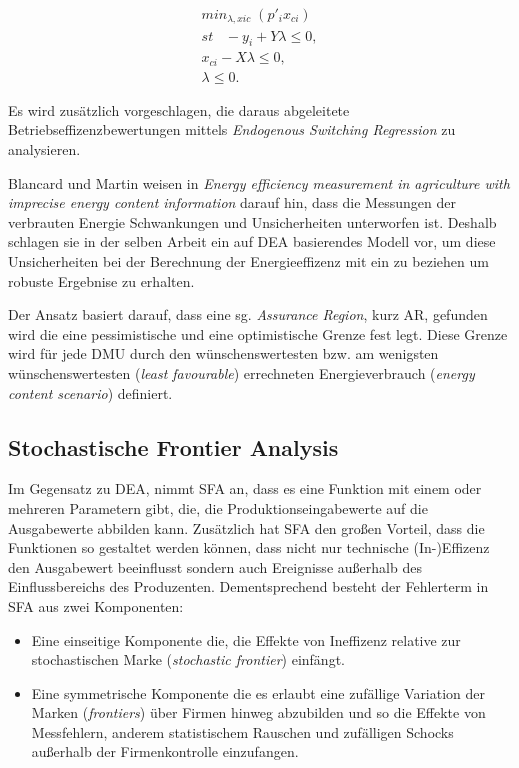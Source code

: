 \begin{gather}
	min_{\lambda,xic} \; (p'_{i}x_{ci}) \\
	st \;\;\; - y_i+Y\lambda \leq 0, \\
	x_{ci} - X \lambda \leq 0, \\
	\lambda \leq 0.
\end{gather}

Es wird zusätzlich vorgeschlagen, die daraus abgeleitete Betriebseffizenzbewertungen mittels \textit{Endogenous Switching Regression} zu analysieren.

Blancard und Martin weisen in \textit{Energy efficiency measurement in agriculture with imprecise energy content information} darauf hin, dass die Messungen der verbrauten Energie Schwankungen und Unsicherheiten unterworfen ist. Deshalb schlagen sie in der selben Arbeit ein auf DEA basierendes Modell vor, um diese Unsicherheiten bei der Berechnung der Energieeffizenz mit ein zu beziehen um robuste Ergebnise zu erhalten.\cite{jour:Blancard2014}

Der Ansatz basiert darauf, dass eine sg. \textit{Assurance Region}, kurz AR, gefunden wird die eine pessimistische und eine optimistische Grenze fest legt. Diese Grenze wird für jede DMU durch den wünschenswertesten bzw. am wenigsten wünschenswertesten (\textit{least favourable}) errechneten Energieverbrauch (\textit{energy content scenario}) definiert.\cite{jour:Blancard2014}

\subsection{Stochastische Frontier Analysis}
Im Gegensatz zu DEA, nimmt SFA an, dass es eine Funktion mit einem oder mehreren Parametern gibt, die, die Produktionseingabewerte auf die Ausgabewerte abbilden kann. Zusätzlich hat SFA den großen Vorteil, dass die Funktionen so gestaltet werden können, dass nicht nur technische (In-)Effizenz den Ausgabewert beeinflusst sondern auch Ereignisse außerhalb des Einflussbereichs des Produzenten. Dementsprechend besteht der Fehlerterm in SFA aus zwei Komponenten:
\begin{itemize}
	\item Eine einseitige Komponente die, die Effekte von Ineffizenz relative zur stochastischen Marke (\textit{stochastic frontier}) einfängt.
	\item Eine symmetrische Komponente die es erlaubt eine zufällige Variation der Marken (\textit{frontiers}) über Firmen hinweg abzubilden und so die Effekte von Messfehlern, anderem statistischem Rauschen und zufälligen Schocks außerhalb der Firmenkontrolle einzufangen.
\end{itemize}

